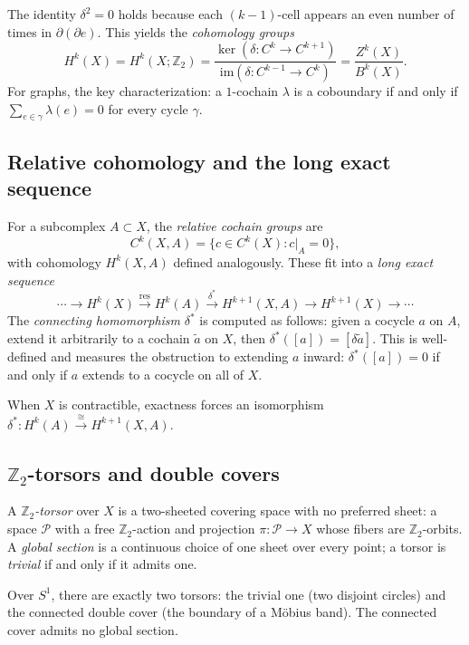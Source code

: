 \documentclass[11pt]{amsart}  %
\theoremstyle{plain}
\theoremstyle{definition}
\theoremstyle{remark}
\newcommand{\style}[1]{{\em #1}} %
\newcommand{\torsor}{\mathcal{P}} %
\newcommand{\coboundary}{\delta} %
\newcommand{\connecting}{\delta^*} %
\newcommand{\Z}{\mathbb{Z}} %
\newcommand{\coupling}{\lambda} %
\begin{document}
The identity $\coboundary^2 = 0$ holds because each $(k-1)$-cell appears an 
even number of times in $\partial(\partial e)$. This yields the 
\style{cohomology groups}
\[
H^k(X) = H^k(X; \Z_2) = \frac{\ker(\coboundary: C^k \to C^{k+1})}
{\mathrm{im}(\coboundary: C^{k-1} \to C^k)} = \frac{Z^k(X)}{B^k(X)}.
\]
For graphs, the key characterization: a $1$-cochain $\coupling$ is a 
coboundary if and only if $\sum_{e \in \gamma} \coupling(e) = 0$ for every 
cycle $\gamma$.

\subsection{Relative cohomology and the long exact sequence}

For a subcomplex $A \subset X$, the \style{relative cochain groups} are
\[
C^k(X, A) = \{ c \in C^k(X) : c|_A = 0 \},
\]
with cohomology $H^k(X, A)$ defined analogously. These fit into a 
\style{long exact sequence}
\[
\cdots \to H^k(X) \xrightarrow{\mathrm{res}} H^k(A) 
\xrightarrow{\connecting} H^{k+1}(X,A) \to H^{k+1}(X) \to \cdots
\]
The \style{connecting homomorphism} $\connecting$ is computed as follows: 
given a cocycle $a$ on $A$, extend it arbitrarily to a cochain $\tilde{a}$ 
on $X$, then $\connecting([a]) = [\coboundary \tilde{a}]$. This is 
well-defined and measures the obstruction to extending $a$ inward: 
$\connecting([a]) = 0$ if and only if $a$ extends to a cocycle on all of $X$.

When $X$ is contractible, exactness forces an isomorphism 
$\connecting: H^k(A) \xrightarrow{\cong} H^{k+1}(X, A)$.

\subsection{$\Z_2$-torsors and double covers}

A \style{$\Z_2$-torsor} over $X$ is a two-sheeted covering space with no 
preferred sheet: a space $\torsor$ with a free $\Z_2$-action and projection 
$\pi: \torsor \to X$ whose fibers are $\Z_2$-orbits. A \style{global section} 
is a continuous choice of one sheet over every point; a torsor is 
\style{trivial} if and only if it admits one.

Over $S^1$, there are exactly two torsors: the trivial one (two disjoint 
circles) and the connected double cover (the boundary of a M\"obius band). 
The connected cover admits no global section.
\end{document}
